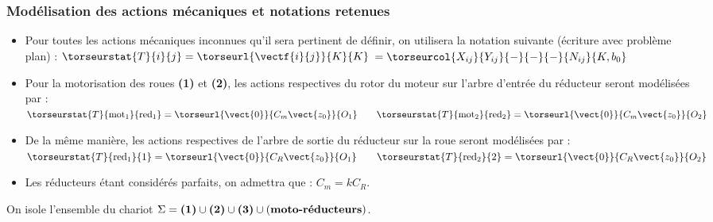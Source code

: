 \subsubsection*{Modélisation des actions mécaniques et notations retenues}
\begin{itemize}
    \item Pour toutes les actions mécaniques inconnues qu'il sera pertinent de définir, on utilisera la notation suivante (écriture avec problème plan) :
	$\torseurstat{T}{i}{j}=\torseurl{\vectf{i}{j}}{K}{K}$ $=\torseurcol{X_{ij}}{Y_{ij}}{-}{-}{-}{N_{ij}}{K,b_0}$

    \item Pour la motorisation des roues \textbf{(1)} et \textbf{(2)}, les actions respectives du rotor du moteur sur l’arbre d’entrée du réducteur seront modélisées par :
    $\torseurstat{T}{\text{mot}_1}{\text{red}_1}=\torseurl{\vect{0}}{C_m\vect{z_0}}{O_1} 
    \quad \quad
    \torseurstat{T}{\text{mot}_2}{\text{red}_2}=\torseurl{\vect{0}}{C_m\vect{z_0}}{O_2}$
    \item De la même manière, les actions respectives de l’arbre de sortie du réducteur sur la roue seront modélisées par :
    $\torseurstat{T}{\text{red}_1}{1}=\torseurl{\vect{0}}{C_R\vect{z_0}}{O_1} 
    \quad \quad
    \torseurstat{T}{\text{red}_2}{2}=\torseurl{\vect{0}}{C_R\vect{z_0}}{O_2}$
    \item Les réducteurs étant considérés parfaits, on admettra que :	 $C_m = k C_R$.
\end{itemize}


On isole l'ensemble du chariot $\Sigma=\textbf{(1)}\cup \textbf{(2)}\cup \textbf{(3)}\cup (\text{\textbf{moto-réducteurs}})$.


\ifprof
\begin{corrige}
\end{corrige}
\else
\fi


\ifprof
\begin{corrige}
\end{corrige}
\else
\fi

